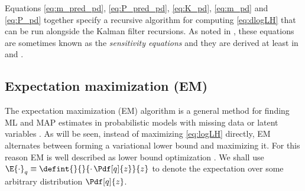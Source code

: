 Equations \eqref{eq:m_pred_pd}, \eqref{eq:P_pred_pd}, \eqref{eq:K_pd}, \eqref{eq:m_pd} and \eqref{eq:P_pd} together specify
a recursive algorithm for computing \eqref{eq:dlogLH} that can be run alongside the Kalman filter recursions.
As noted in \textcite{Cappe2005}, these equations are sometimes known as the \emph{sensitivity equations}
and they are derived at least in \textcite{Gupta1974} and \textcite{Mbalawataa}.

\subsection{Expectation maximization (EM)}%

The expectation maximization (EM) algorithm \parencite{Dempster1977} is a general
method for finding ML and MAP estimates in probabilistic models with missing data or
latent variables \parencite{Bishop2006,barber2012bayesian}. As will be seen, instead of maximizing
\eqref{eq:logLH} directly, EM alternates between forming a variational lower bound and maximizing it.
For this reason EM is well described as lower bound optimization \parencite{Minka1998}.
We shall use $\E{\cdot}_{q}\equiv\defint{}{}{\cdot\,\Pdf[q]{z}}{z}$ to denote the expectation
over some arbitrary distribution $\Pdf[q]{z}$.

